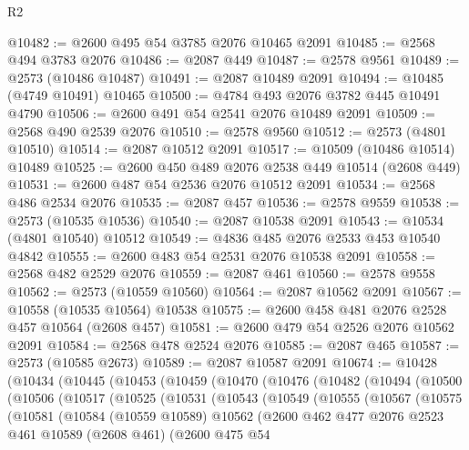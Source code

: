 \begin{lexlean}{R2}
\begin{coremodule}
@10482 := @2600 @495 @54 @3785 @2076 @10465 @2091
@10485 := @2568 @494 @3783 @2076
@10486 := @2087 @449
@10487 := @2578 @9561
@10489 := @2573 (@10486 @10487)
@10491 := @2087 @10489 @2091
@10494 := @10485 (@4749 @10491) @10465
@10500 := @4784 @493 @2076 @3782 @445 @10491 @4790
@10506 := @2600 @491 @54 @2541 @2076 @10489 @2091
@10509 := @2568 @490 @2539 @2076
@10510 := @2578 @9560
@10512 := @2573 (@4801 @10510)
@10514 := @2087 @10512 @2091
@10517 := @10509 (@10486 @10514) @10489
@10525 := @2600 @450 @489 @2076 @2538 @449 @10514 (@2608 @449)
@10531 := @2600 @487 @54 @2536 @2076 @10512 @2091
@10534 := @2568 @486 @2534 @2076
@10535 := @2087 @457
@10536 := @2578 @9559
@10538 := @2573 (@10535 @10536)
@10540 := @2087 @10538 @2091
@10543 := @10534 (@4801 @10540) @10512
@10549 := @4836 @485 @2076 @2533 @453 @10540 @4842
@10555 := @2600 @483 @54 @2531 @2076 @10538 @2091
@10558 := @2568 @482 @2529 @2076
@10559 := @2087 @461
@10560 := @2578 @9558
@10562 := @2573 (@10559 @10560)
@10564 := @2087 @10562 @2091
@10567 := @10558 (@10535 @10564) @10538
@10575 := @2600 @458 @481 @2076 @2528 @457 @10564 (@2608 @457)
@10581 := @2600 @479 @54 @2526 @2076 @10562 @2091
@10584 := @2568 @478 @2524 @2076
@10585 := @2087 @465
@10587 := @2573 (@10585 @2673)
@10589 := @2087 @10587 @2091
@10674 := @10428
    (@10434
      (@10445
        (@10453
          (@10459
            (@10470
              (@10476
                (@10482
                  (@10494
                    (@10500
                      (@10506
                        (@10517
                          (@10525
                            (@10531
                              (@10543
                                (@10549
                                  (@10555
                                    (@10567
                                      (@10575
                                        (@10581
                                          (@10584
                                            (@10559 @10589)
                                            @10562
                                            (@2600
                                              @462
                                              @477
                                              @2076
                                              @2523
                                              @461
                                              @10589
                                              (@2608 @461)
                                              (@2600
                                                @475
                                                @54

\end{coremodule}
\end{lexlean}

